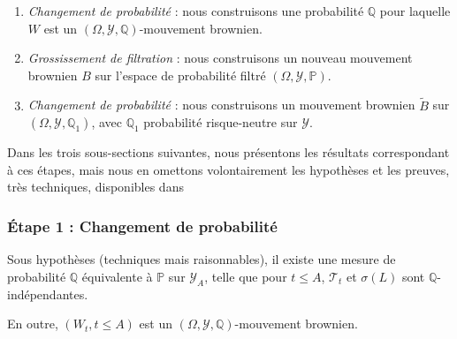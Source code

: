 \documentclass[../finalreport.tex]{subfiles}
\begin{document}
\begin{enumerate}
\item \textit{Changement de probabilité} : nous construisons une probabilité $\mathbb{Q}$ pour laquelle $W$ est un $\left(\Omega, \mathcal{Y}, \mathbb{Q} \right)$-mouvement brownien.
\item \textit{Grossissement de filtration} : nous construisons un nouveau mouvement brownien $B$ sur l'espace de probabilité filtré  $(\Omega, \mathcal{Y}, \mathbb{P})$.
\item \textit{Changement de probabilité} : nous construisons un mouvement brownien $\tilde{B}$ sur $\left(\Omega, \mathcal{Y}, \mathbb{Q}_1 \right)$, avec $\mathbb{Q}_1$ probabilité risque-neutre sur $\mathcal{Y}$.
\end{enumerate}

\par Dans les trois sous-sections suivantes, nous présentons les résultats correspondant à ces étapes, mais nous en omettons volontairement les hypothèses et les preuves, très techniques, disponibles dans \cite{art2}


\subsubsection{Étape 1 : Changement de probabilité}
\begin{prop}[T.Jeulin]
\par Sous hypothèses (techniques mais raisonnables), il existe une mesure de probabilité $\mathbb{Q}$ équivalente à $\mathbb{P}$ sur $\mathcal{Y}_A$, telle que pour $t \leq A$, $\mathcal{T}_t$ et $\sigma \left( L \right)$ sont $\mathbb{Q}$-indépendantes.
\par En outre, $\left( W_t, t \leq A \right)$ est un $\left(\Omega, \mathcal{Y}, \mathbb{Q} \right)$-mouvement brownien.
\end{prop}
\end{document}
